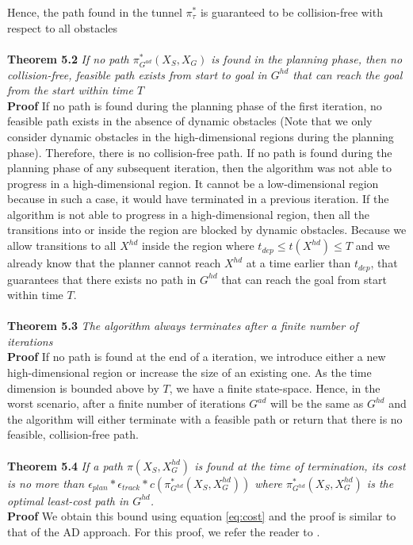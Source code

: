 Hence, the path found in the tunnel $\pi_\tau^*$ is guaranteed to be collision-free with respect to all obstacles \QEDB \\ \\
\textbf{Theorem 5.2} \textit{If no path $\pi_{G^{ad}}^*(X_S,X_G)$ is found in the planning phase, then no collision-free, feasible path exists from start to goal in $G^{hd}$ that can reach the goal from the start within time $T$} \\
\textbf{Proof} If no path is found during the planning phase of the first iteration, no feasible path exists in the absence of dynamic obstacles (Note that we only consider dynamic obstacles in the high-dimensional regions during the planning phase). Therefore, there is no collision-free path. If no path is found during the planning phase of any subsequent iteration, then the algorithm was not able to progress in a high-dimensional region. It cannot be a low-dimensional region because in such a case, it would have terminated in a previous iteration. If the algorithm is not able to progress in a high-dimensional region, then all the transitions into or inside the region are blocked by dynamic obstacles. Because we allow transitions to all $X^{hd}$ inside the region where $t_{dep} \leq t(X^{hd}) \leq T$ and we already know that the planner cannot reach $X^{hd}$ at a time earlier than $t_{dep}$, that guarantees that there exists no path in $G^{hd}$ that can reach the goal from start within time $T$.\QEDB\\ \\
\textbf{Theorem 5.3} \textit{The algorithm always terminates after a finite number of iterations} \\
\textbf{Proof} If no path is found at the end of a iteration, we introduce either a new high-dimensional region or increase the size of an existing one. As the time dimension is bounded above by $T$, we have a finite state-space. Hence, in the worst scenario, after a finite number of iterations $G^{ad}$ will be the same as $G^{hd}$ and the algorithm will either terminate with a feasible path or return that there is no feasible, collision-free path. \QEDB \\\\
\iftrue
\textbf{Theorem 5.4} \textit{If a path $\pi(X_S, X_G^{hd})$ is found at the time of termination, its cost is no more than $\epsilon_{plan}*\epsilon_{track}*c(\pi_{G^{hd}}^*(X_S,X_G^{hd}))$ where $\pi_{G^{hd}}^*(X_S,X_G^{hd})$ is the optimal least-cost path in $G^{hd}$.} \\
\textbf{Proof} We obtain this bound using equation \ref{eq:cost} and the proof is similar to that of the AD approach. For this proof, we refer the reader to \cite{gochev2011path}. \QEDB 
